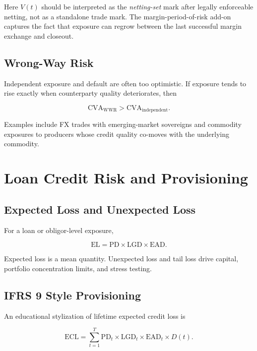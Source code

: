 \documentclass{apex_mdd}
\begin{document}
Here $V(t)$ should be interpreted as the \emph{netting-set} mark after legally enforceable netting, not as a standalone trade mark. The margin-period-of-risk add-on captures the fact that exposure can regrow between the last successful margin exchange and closeout.

\subsection{Wrong-Way Risk}

Independent exposure and default are often too optimistic. If exposure tends to rise exactly when counterparty quality deteriorates, then
\begin{formulabox}
\[
  \mathrm{CVA}_{\mathrm{WWR}} > \mathrm{CVA}_{\mathrm{independent}}.
\]
\end{formulabox}

Examples include FX trades with emerging-market sovereigns and commodity exposures to producers whose credit quality co-moves with the underlying commodity.

\section{Loan Credit Risk and Provisioning}

\subsection{Expected Loss and Unexpected Loss}

For a loan or obligor-level exposure,
\begin{formulabox}
\[
  \mathrm{EL} = \mathrm{PD}\times \mathrm{LGD}\times \mathrm{EAD}.
\]
\end{formulabox}

Expected loss is a mean quantity. Unexpected loss and tail loss drive capital, portfolio concentration limits, and stress testing.

\subsection{IFRS 9 Style Provisioning}

An educational stylization of lifetime expected credit loss is
\begin{formulabox}
\[
  \mathrm{ECL}
  =
  \sum_{t=1}^{T}
  \mathrm{PD}_t
  \times
  \mathrm{LGD}_t
  \times
  \mathrm{EAD}_t
  \times
  D(t).
\]
\end{formulabox}
\end{document}
